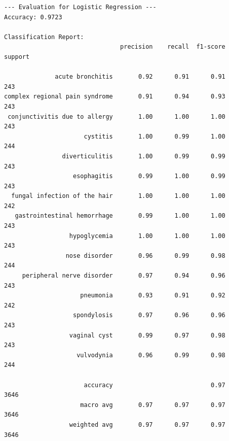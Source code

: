 \documentclass[11pt]{article}
\begin{document}
    \begin{Verbatim}[commandchars=\\\{\}]
--- Evaluation for Logistic Regression ---
Accuracy: 0.9723

Classification Report:
                                precision    recall  f1-score   support

              acute bronchitis       0.92      0.91      0.91       243
complex regional pain syndrome       0.91      0.94      0.93       243
 conjunctivitis due to allergy       1.00      1.00      1.00       243
                      cystitis       1.00      0.99      1.00       244
                diverticulitis       1.00      0.99      0.99       243
                   esophagitis       0.99      1.00      0.99       243
  fungal infection of the hair       1.00      1.00      1.00       242
   gastrointestinal hemorrhage       0.99      1.00      1.00       243
                  hypoglycemia       1.00      1.00      1.00       243
                 nose disorder       0.96      0.99      0.98       244
     peripheral nerve disorder       0.97      0.94      0.96       243
                     pneumonia       0.93      0.91      0.92       242
                   spondylosis       0.97      0.96      0.96       243
                  vaginal cyst       0.99      0.97      0.98       243
                    vulvodynia       0.96      0.99      0.98       244

                      accuracy                           0.97      3646
                     macro avg       0.97      0.97      0.97      3646
                  weighted avg       0.97      0.97      0.97      3646

    \end{Verbatim}

    \begin{center}
    \end{center}
    { \hspace*{\fill} \\}
    
\end{document}
